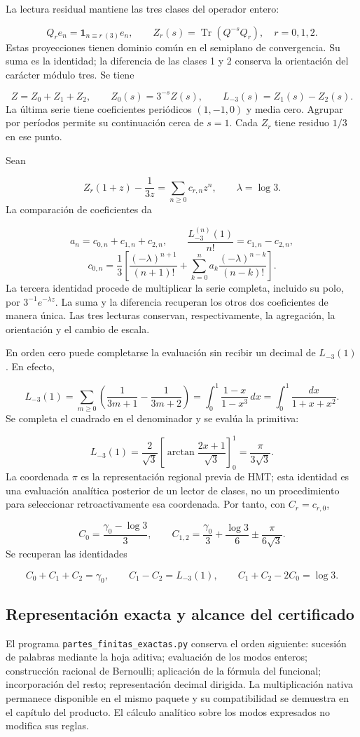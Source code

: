 La lectura residual mantiene las tres clases del operador entero:

\[
Q_re_n=\mathbf1_{n\equiv r\ (3)}e_n,\qquad
Z_r(s)=\operatorname{Tr}(Q^{-s}Q_r),\quad r=0,1,2.
\]
Estas proyecciones tienen dominio común en el semiplano de convergencia. Su suma es la identidad; la diferencia de las clases 1 y 2 conserva la orientación del carácter módulo tres. Se tiene

\[
Z=Z_0+Z_1+Z_2,\qquad Z_0(s)=3^{-s}Z(s),\qquad
L_{-3}(s)=Z_1(s)-Z_2(s).
\]
La última serie tiene coeficientes periódicos \((1,-1,0)\) y media cero. Agrupar por períodos permite su continuación cerca de \(s=1\). Cada \(Z_r\) tiene residuo \(1/3\) en ese punto.

Sean

\[
Z_r(1+z)-\frac1{3z}=\sum_{n\geq0}c_{r,n}z^n,
\qquad \lambda=\log3.
\]
La comparación de coeficientes da

\[
a_n=c_{0,n}+c_{1,n}+c_{2,n},\qquad
\frac{L_{-3}^{(n)}(1)}{n!}=c_{1,n}-c_{2,n},
\]
\[
c_{0,n}=\frac13\left[
\frac{(-\lambda)^{n+1}}{(n+1)!}
+\sum_{k=0}^na_k\frac{(-\lambda)^{n-k}}{(n-k)!}\right].
\]
La tercera identidad procede de multiplicar la serie completa, incluido su polo, por \(3^{-1}e^{-\lambda z}\). La suma y la diferencia recuperan los otros dos coeficientes de manera única. Las tres lecturas conservan, respectivamente, la agregación, la orientación y el cambio de escala.

En orden cero puede completarse la evaluación sin recibir un decimal de \(L_{-3}(1)\). En efecto,

\[
L_{-3}(1)=\sum_{m\geq0}\left(\frac1{3m+1}-\frac1{3m+2}\right)
=\int_0^1\frac{1-x}{1-x^3}\,dx
=\int_0^1\frac{dx}{1+x+x^2}.
\]
Se completa el cuadrado en el denominador y se evalúa la primitiva:

\[
L_{-3}(1)=\frac2{\sqrt3}
\left[\arctan\frac{2x+1}{\sqrt3}\right]_0^1
=\frac{\pi}{3\sqrt3}.
\]
La coordenada \(\pi\) es la representación regional previa de HMT; esta identidad es una evaluación analítica posterior de un lector de clases, no un procedimiento para seleccionar retroactivamente esa coordenada. Por tanto, con \(C_r=c_{r,0}\),

\[
C_0=\frac{\gamma_0-\log3}{3},\qquad
C_{1,2}=\frac{\gamma_0}{3}+\frac{\log3}{6}
\mathbin{\pm}\frac{\pi}{6\sqrt3}.
\]
Se recuperan las identidades

\[
C_0+C_1+C_2=\gamma_0,\qquad
C_1-C_2=L_{-3}(1),\qquad C_1+C_2-2C_0=\log3.
\]
\clearpage
\subsection{Representación exacta y alcance del certificado}
El programa \texttt{partes\_\allowbreak{}finitas\_\allowbreak{}exactas.\allowbreak{}py} conserva el orden siguiente: sucesión de palabras mediante la hoja aditiva; evaluación de los modos enteros; construcción racional de Bernoulli; aplicación de la fórmula del funcional; incorporación del resto; representación decimal dirigida. La multiplicación nativa permanece disponible en el mismo paquete y su compatibilidad se demuestra en el capítulo del producto. El cálculo analítico sobre los modos expresados no modifica sus reglas.

